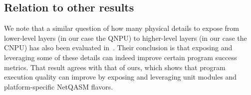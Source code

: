 \subsection{Relation to other results}
We note that a similar question of how many physical details to expose from lower-level layers (in our case the \ac{QNPU}) to higher-level layers (in our case the \ac{CNPU}) has also been evaluated in~\cite{murali2019fullstack}.
Their conclusion is that exposing and leveraging some of these details can indeed improve certain program success metrics.
That result agrees with that of ours, which shows that program execution quality can improve by exposing and leveraging unit modules and platform-specific \ac{NetQASM} flavors.

